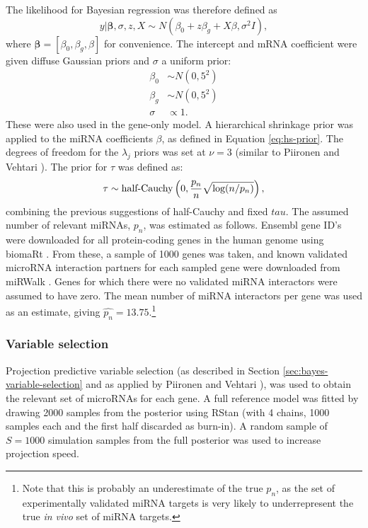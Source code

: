 The likelihood for Bayesian regression was therefore defined as
\begin{equation}
	y | \mathbf{\beta}, \sigma, z, X \sim N(\beta_0 + z \beta_g + X \beta, \sigma^2I),
\end{equation}
where $\mathbf{\beta} = [\beta_0, \beta_g, \beta]$ for convenience.
The intercept and mRNA coefficient were given diffuse Gaussian priors
and $\sigma$ a uniform prior:
\begin{subequations}
  \begin{align}
    \beta_0 & \sim N(0, 5^2) \\
    \beta_g & \sim N(0, 5^2) \\
    \sigma  & \propto 1.
  \end{align}
\end{subequations}
These were also used in the gene-only model.
A hierarchical shrinkage prior was applied to the miRNA coefficients $\beta$,
as defined in Equation \eqref{eq:hs-prior}. The degrees of freedom for the
$\lambda_j$ priors was set at $\nu=3$ (similar to Piironen and Vehtari
\citep{Piironen2015}). The prior for $\tau$ was defined as:
\begin{equation}
    \tau \sim \textup{half-Cauchy} \left ( 0, \frac{p_n}{n}\sqrt{\textup{log}(n/p_n)} \right ),
\end{equation}
combining the previous suggestions of half-Cauchy and fixed $tau$.
The assumed number of relevant miRNAs, $p_n$, was estimated as follows.
Ensembl gene ID's were downloaded for all protein-coding genes in the human
genome using biomaRt \citep{biomaRt}. From these, a sample of 1000 genes was
taken, and known validated microRNA interaction partners for each sampled gene
were downloaded from miRWalk \citep{Dweep2015}. Genes for which there were no
validated miRNA interactors were assumed to have zero. The mean number of
miRNA interactors per gene was used as an estimate, giving
$\hat{p_n} = 13.75$.\footnote{Note that this is probably an underestimate of
the true $p_n$, as the set of experimentally validated miRNA targets is
very likely to underrepresent the true \emph{in vivo} set of miRNA targets.}



\subsubsection{Variable selection}\label{sec:methods-variable-selection}

Projection predictive variable selection (as described in Section
\ref{sec:bayes-variable-selection} and as applied by Piironen and Vehtari \citep{Piironen2015}),
was used to obtain the relevant set of microRNAs for each gene. A full
reference model was fitted by drawing 2000 samples from the posterior using
RStan (with 4 chains, 1000 samples each and the first half discarded as burn-in).
A random sample of $S=1000$ simulation samples from the full posterior was used
to increase projection speed.

